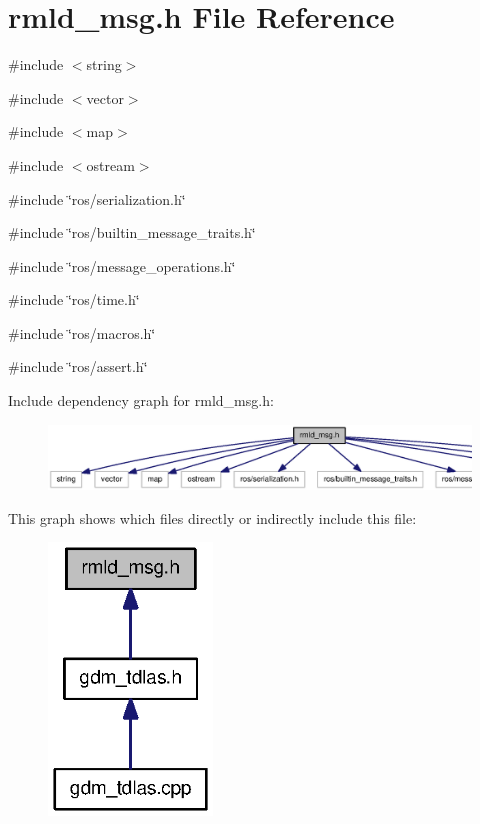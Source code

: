\section{rmld\_\-msg.h File Reference}
\label{rmld__msg_8h}
{\ttfamily \#include $<$string$>$}\par
{\ttfamily \#include $<$vector$>$}\par
{\ttfamily \#include $<$map$>$}\par
{\ttfamily \#include $<$ostream$>$}\par
{\ttfamily \#include \char`\"{}ros/serialization.h\char`\"{}}\par
{\ttfamily \#include \char`\"{}ros/builtin\_\-message\_\-traits.h\char`\"{}}\par
{\ttfamily \#include \char`\"{}ros/message\_\-operations.h\char`\"{}}\par
{\ttfamily \#include \char`\"{}ros/time.h\char`\"{}}\par
{\ttfamily \#include \char`\"{}ros/macros.h\char`\"{}}\par
{\ttfamily \#include \char`\"{}ros/assert.h\char`\"{}}\par
Include dependency graph for rmld\_\-msg.h:
\nopagebreak
\begin{figure}[H]
\begin{center}
\leavevmode
\includegraphics[width=400pt]{rmld__msg_8h__incl}
\end{center}
\end{figure}
This graph shows which files directly or indirectly include this file:
\nopagebreak
\begin{figure}[H]
\begin{center}
\leavevmode
\includegraphics[width=124pt]{rmld__msg_8h__dep__incl}
\end{center}
\end{figure}
